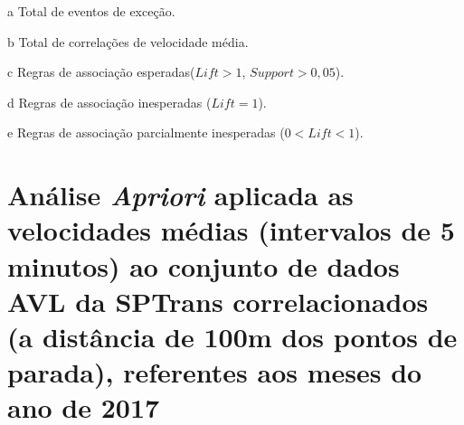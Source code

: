 \documentclass[
	12pt,				%
	oneside,			%
	a4paper,			%
	english,			%
	brazil				%
	]{abntex2ppgsi}
\begin{document}
{{\begin{apendicesenv}
\begin{table}[!htb]
\begin{threeparttable}
\begin{tablenotes}
            \item[a] Total de eventos de exceção.
            \item[b] Total de correlações de velocidade média.
            \item[c] Regras de associação esperadas($Lift > 1$, $Support > 0,05$).
            \item[d] Regras de associação inesperadas ($Lift = 1$).
            \item[e] Regras de associação parcialmente inesperadas ($0 < Lift < 1$).
        \end{tablenotes}
\end{threeparttable}
\end{table}

\clearpage

\section{Análise \textit{Apriori} aplicada as velocidades médias (intervalos de 5 minutos) ao conjunto de dados AVL da SPTrans correlacionados (a distância de 100m dos pontos de parada), referentes aos meses do ano de 2017}
\label{g3}


\end{apendicesenv}}}
\end{document}

